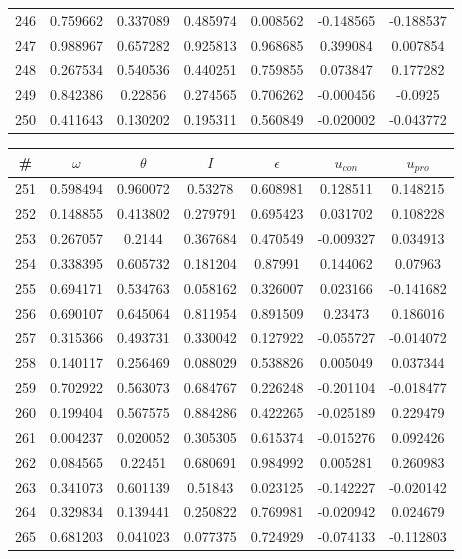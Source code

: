 \begin{table}
\begin{tabular}{c|c|c|c|c|c|c}
246 & 0.759662 & 0.337089 & 0.485974 & 0.008562 & -0.148565 & -0.188537\\
247 & 0.988967 & 0.657282 & 0.925813 & 0.968685 & 0.399084 & 0.007854\\
248 & 0.267534 & 0.540536 & 0.440251 & 0.759855 & 0.073847 & 0.177282\\
249 & 0.842386 & 0.22856 & 0.274565 & 0.706262 & -0.000456 & -0.0925\\
250 & 0.411643 & 0.130202 & 0.195311 & 0.560849 & -0.020002 & -0.043772\\
\end{tabular}
\end{table}
\newpage
\begin{table}
\begin{tabular}{c|c|c|c|c|c|c}
\# & $\omega$ & $\theta$ & $I$ & $\epsilon$ & $u_{con}$ & $u_{pro}$\\
\hline
251 & 0.598494 & 0.960072 & 0.53278 & 0.608981 & 0.128511 & 0.148215\\
252 & 0.148855 & 0.413802 & 0.279791 & 0.695423 & 0.031702 & 0.108228\\
253 & 0.267057 & 0.2144 & 0.367684 & 0.470549 & -0.009327 & 0.034913\\
254 & 0.338395 & 0.605732 & 0.181204 & 0.87991 & 0.144062 & 0.07963\\
255 & 0.694171 & 0.534763 & 0.058162 & 0.326007 & 0.023166 & -0.141682\\
256 & 0.690107 & 0.645064 & 0.811954 & 0.891509 & 0.23473 & 0.186016\\
257 & 0.315366 & 0.493731 & 0.330042 & 0.127922 & -0.055727 & -0.014072\\
258 & 0.140117 & 0.256469 & 0.088029 & 0.538826 & 0.005049 & 0.037344\\
259 & 0.702922 & 0.563073 & 0.684767 & 0.226248 & -0.201104 & -0.018477\\
260 & 0.199404 & 0.567575 & 0.884286 & 0.422265 & -0.025189 & 0.229479\\
261 & 0.004237 & 0.020052 & 0.305305 & 0.615374 & -0.015276 & 0.092426\\
262 & 0.084565 & 0.22451 & 0.680691 & 0.984992 & 0.005281 & 0.260983\\
263 & 0.341073 & 0.601139 & 0.51843 & 0.023125 & -0.142227 & -0.020142\\
264 & 0.329834 & 0.139441 & 0.250822 & 0.769981 & -0.020942 & 0.024679\\
265 & 0.681203 & 0.041023 & 0.077375 & 0.724929 & -0.074133 & -0.112803\\

\end{tabular}
\end{table}
